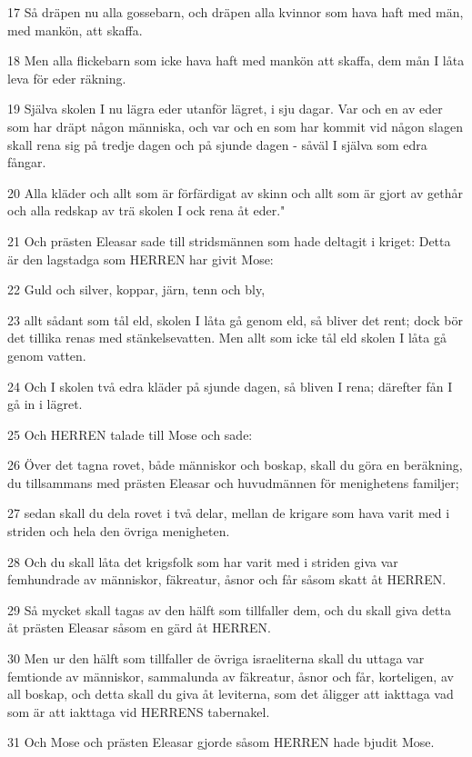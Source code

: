 \par 17 Så dräpen nu alla gossebarn, och dräpen alla kvinnor som hava haft med män, med mankön, att skaffa.
\par 18 Men alla flickebarn som icke hava haft med mankön att skaffa, dem mån I låta leva för eder räkning.
\par 19 Själva skolen I nu lägra eder utanför lägret, i sju dagar. Var och en av eder som har dräpt någon människa, och var och en som har kommit vid någon slagen skall rena sig på tredje dagen och på sjunde dagen - såväl I själva som edra fångar.
\par 20 Alla kläder och allt som är förfärdigat av skinn och allt som är gjort av gethår och alla redskap av trä skolen I ock rena åt eder."
\par 21 Och prästen Eleasar sade till stridsmännen som hade deltagit i kriget: Detta är den lagstadga som HERREN har givit Mose:
\par 22 Guld och silver, koppar, järn, tenn och bly,
\par 23 allt sådant som tål eld, skolen I låta gå genom eld, så bliver det rent; dock bör det tillika renas med stänkelsevatten. Men allt som icke tål eld skolen I låta gå genom vatten.
\par 24 Och I skolen två edra kläder på sjunde dagen, så bliven I rena; därefter fån I gå in i lägret.
\par 25 Och HERREN talade till Mose och sade:
\par 26 Över det tagna rovet, både människor och boskap, skall du göra en beräkning, du tillsammans med prästen Eleasar och huvudmännen för menighetens familjer;
\par 27 sedan skall du dela rovet i två delar, mellan de krigare som hava varit med i striden och hela den övriga menigheten.
\par 28 Och du skall låta det krigsfolk som har varit med i striden giva var femhundrade av människor, fäkreatur, åsnor och får såsom skatt åt HERREN.
\par 29 Så mycket skall tagas av den hälft som tillfaller dem, och du skall giva detta åt prästen Eleasar såsom en gärd åt HERREN.
\par 30 Men ur den hälft som tillfaller de övriga israeliterna skall du uttaga var femtionde av människor, sammalunda av fäkreatur, åsnor och får, korteligen, av all boskap, och detta skall du giva åt leviterna, som det åligger att iakttaga vad som är att iakttaga vid HERRENS tabernakel.
\par 31 Och Mose och prästen Eleasar gjorde såsom HERREN hade bjudit Mose.
